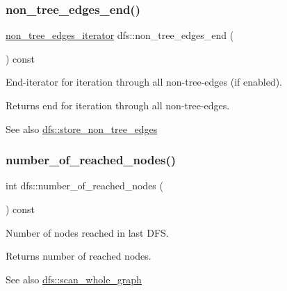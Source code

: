 \subsubsection{\texorpdfstring{non\+\_\+tree\+\_\+edges\+\_\+end()}{non\_tree\_edges\_end()}}
{\footnotesize\ttfamily \mbox{\hyperlink{classdfs_ae7301f3d4417e60fb3a499180375194e}{non\+\_\+tree\+\_\+edges\+\_\+iterator}} dfs\+::non\+\_\+tree\+\_\+edges\+\_\+end (\begin{DoxyParamCaption}{ }\end{DoxyParamCaption}) const\hspace{0.3cm}{\ttfamily [inline]}}



End-\/iterator for iteration through all non-\/tree-\/edges (if enabled). 

\begin{DoxyReturn}{Returns}
end for iteration through all non-\/tree-\/edges. 
\end{DoxyReturn}
\begin{DoxySeeAlso}{See also}
\mbox{\hyperlink{classdfs_a6f54f1c4339eacc8961e795439d4593d}{dfs\+::store\+\_\+non\+\_\+tree\+\_\+edges}} 
\end{DoxySeeAlso}
\mbox{\label{classdfs_ae8849a552721ad4af5d9a81c6da35822}} 
\subsubsection{\texorpdfstring{number\+\_\+of\+\_\+reached\+\_\+nodes()}{number\_of\_reached\_nodes()}}
{\footnotesize\ttfamily int dfs\+::number\+\_\+of\+\_\+reached\+\_\+nodes (\begin{DoxyParamCaption}{ }\end{DoxyParamCaption}) const\hspace{0.3cm}{\ttfamily [inline]}}



Number of nodes reached in last D\+FS. 

\begin{DoxyReturn}{Returns}
number of reached nodes. 
\end{DoxyReturn}
\begin{DoxySeeAlso}{See also}
\mbox{\hyperlink{classdfs_aa7c864a6f3a120720138b187b3ed95b5}{dfs\+::scan\+\_\+whole\+\_\+graph}} 
\end{DoxySeeAlso}
\mbox{\label{classdfs_adf1c667188e632761c63f529537c544c}} 
